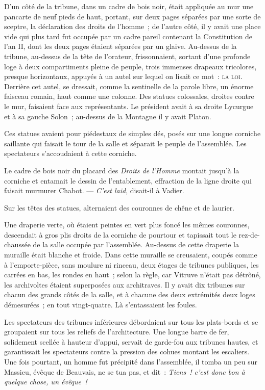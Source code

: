 \documentclass[french,twoside]{book} %
\begin{document}
D’un côté de la tribune, dans un cadre de bois noir, était appliquée au mur une pancarte de neuf pieds de haut, portant, sur deux pages séparées par une sorte de sceptre, la déclaration des droits de l’homme ; de l’autre côté, il y avait une place vide qui plus tard fut occupée par un cadre pareil contenant la Constitution de l’an II, dont les deux pages étaient séparées par un glaive. Au-dessus de la tribune, au-dessus de la tête de l’orateur, frissonnaient, sortant d’une profonde loge à deux compartiments pleine de peuple, trois immenses drapeaux tricolores, presque horizontaux, appuyés à un autel sur lequel on lisait ce mot : {\scshape la loi}. Derrière cet autel, se dressait, comme la sentinelle de la parole libre, un énorme faisceau romain, haut comme une colonne. Des statues colossales, droites contre le mur, faisaient face aux représentants.  Le président avait à sa droite Lycurgue et à sa gauche Solon ; au-dessus de la Montagne il y avait Platon.\par
Ces statues avaient pour piédestaux de simples dés, posés sur une longue corniche saillante qui faisait le tour de la salle et séparait le peuple de l’assemblée. Les spectateurs s’accoudaient à cette corniche.\par
Le cadre de bois noir du placard des \emph{Droits de l’Homme} montait jusqu’à la corniche et entamait le dessin de l’entablement, effraction de la ligne droite qui faisait murmurer Chabot. — \emph{C’est laid}, disait-il à Vadier.\par
Sur les têtes des statues, alternaient des couronnes de chêne et de laurier.\par
Une draperie verte, où étaient peintes en vert plus foncé les mêmes couronnes, descendait à gros plis droits de la corniche de pourtour et tapissait tout le rez-de-chaussée de la salle occupée par l’assemblée. Au-dessus de cette draperie la muraille était blanche et froide. Dans cette muraille se creusaient, coupés comme à l’emporte-pièce, sans moulure ni rinceau, deux étages de tribunes publiques, les carrées en bas, les rondes en haut ; selon la règle, car Vitruve n’était pas détrôné, les archivoltes étaient superposées aux architraves. Il y avait dix tribunes sur chacun des grands côtés de la salle, et à chacune des deux extrémités deux loges démesurées ; en tout vingt-quatre. Là s’entassaient les foules.\par
Les spectateurs des tribunes inférieures débordaient  sur tous les plats-bords et se groupaient sur tous les reliefs de l’architecture. Une longue barre de fer, solidement scellée à hauteur d’appui, servait de garde-fou aux tribunes hautes, et garantissait les spectateurs contre la pression des cohues montant les escaliers. Une fois pourtant, un homme fut précipité dans l’assemblée, il tomba un peu sur Massieu, évêque de Beauvais, ne se tua pas, et dit : \emph{Tiens ! c’est donc bon à quelque chose, un évêque !}\par
\end{document}
